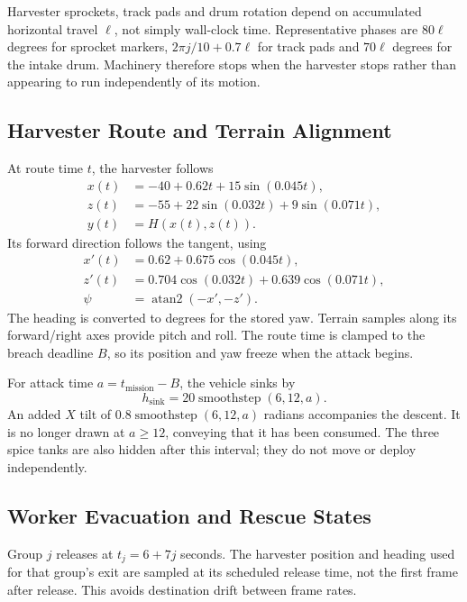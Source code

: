 Harvester sprockets, track pads and drum rotation depend on accumulated horizontal travel $\ell$, not simply wall-clock time. Representative phases are $80\ell$ degrees for sprocket markers, $2\pi j/10+0.7\ell$ for track pads and $70\ell$ degrees for the intake drum. Machinery therefore stops when the harvester stops rather than appearing to run independently of its motion.

\subsection{Harvester Route and Terrain Alignment}
At route time $t$, the harvester follows
\begin{align}
x(t)&=-40+0.62t+15\sin(0.045t),\\
z(t)&=-55+22\sin(0.032t)+9\sin(0.071t),\\
y(t)&=H(x(t),z(t)).
\end{align}
Its forward direction follows the tangent, using
\begin{align}
x'(t)&=0.62+0.675\cos(0.045t),\\
z'(t)&=0.704\cos(0.032t)+0.639\cos(0.071t),\\
\psi&=\operatorname{atan2}(-x',-z').
\end{align}
The heading is converted to degrees for the stored yaw. Terrain samples along its forward/right axes provide pitch and roll. The route time is clamped to the breach deadline $B$, so its position and yaw freeze when the attack begins.

For attack time $a=t_{\mathrm{mission}}-B$, the vehicle sinks by
\begin{equation}
h_{\mathrm{sink}}=20\operatorname{smoothstep}(6,12,a).
\end{equation}
An added $X$ tilt of $0.8\operatorname{smoothstep}(6,12,a)$ radians accompanies the descent. It is no longer drawn at $a\ge12$, conveying that it has been consumed. The three spice tanks are also hidden after this interval; they do not move or deploy independently.

\subsection{Worker Evacuation and Rescue States}
Group $j$ releases at $t_j=6+7j$ seconds. The harvester position and heading used for that group's exit are sampled at its scheduled release time, not the first frame after release. This avoids destination drift between frame rates.

